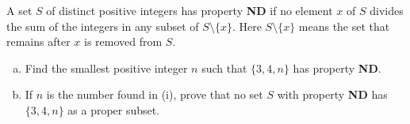 A set $S$ of distinct positive integers has property \textbf{ND} if no element $x$ of
$S$ divides the sum of the integers in any subset of $S \setminus \{x\}$. Here
$S \setminus \{x\}$ means the set that remains after $x$ is removed from $S$.

\begin{enumerate}[(a)]

\item Find the smallest positive integer $n$ such that $\lbrace 3, 4, n
      \rbrace$ has property \textbf{ND}.
\item If $n$ is the number found in (i), prove that no set $S$ with property
      \textbf{ND} has $\lbrace 3, 4, n \rbrace$ as a proper subset.

\end{enumerate}
